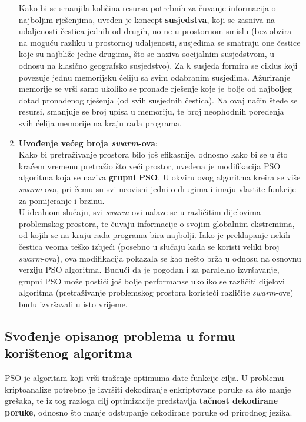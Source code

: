 \documentclass[12pt, a4paper]{article}
\begin{document}
\begin{enumerate}
Kako bi se smanjila količina resursa potrebnih za čuvanje informacija o najboljim rješenjima, uveden je koncept \textbf{susjedstva}, koji se zasniva na udaljenosti čestica jednih od drugih, no ne u prostornom smislu (bez obzira na moguću razliku u prostornoj udaljenosti, susjedima se smatraju one čestice koje su najbliže jedne drugima, što se naziva socijalnim susjedstvom, u odnosu na klasično geografsko susjedstvo). Za \texttt{k} susjeda formira se ciklus koji povezuje jednu memorijsku ćeliju sa svim odabranim susjedima. Ažuriranje memorije se vrši samo ukoliko se pronađe rješenje koje je bolje od najboljeg dotad pronađenog rješenja (od svih susjednih čestica). Na ovaj način štede se resursi, smanjuje se broj upisa u memoriju, te broj neophodnih poređenja svih ćelija memorije na kraju rada programa. \cite{pso2}

\item \textbf{Uvođenje većeg broja \textit{swarm}-ova}: \\

Kako bi pretraživanje prostora bilo još efikasnije, odnosno kako bi se u što kraćem vremenu pretražio što veći prostor, uvedena je modifikacija PSO algoritma koja se naziva \textbf{grupni PSO}. U okviru ovog algoritma kreira se više \textit{swarm}-ova, pri čemu su svi neovisni jedni o drugima i imaju vlastite funkcije za pomijeranje i brzinu. \\

U idealnom slučaju, svi \textit{swarm}-ovi nalaze se u različitim dijelovima problemskog prostora, te čuvaju informacije o svojim globalnim ekstremima, od kojih se na kraju rada programa bira najbolji. Iako je preklapanje nekih čestica veoma teško izbjeći (posebno u slučaju kada se koristi veliki broj \textit{swarm}-ova), ova modifikacija pokazala se kao nešto brža u odnosu na osnovnu verziju PSO algoritma. Budući da je pogodan i za paralelno izvršavanje, grupni PSO može postići još bolje performanse ukoliko se različiti dijelovi algoritma (pretraživanje problemskog prostora koristeći različite \textit{swarm}-ove) budu izvršavali u isto vrijeme. \cite{cryptopso}

\end{enumerate}

\subsection{Svođenje opisanog problema u formu korištenog algoritma}

PSO je algoritam koji vrši traženje optimuma date funkcije cilja. U problemu kriptoanalize potrebno je izvršiti dekodiranje enkriptovane poruke sa što manje grešaka, te iz tog razloga cilj optimizacije predstavlja \textbf{tačnost dekodirane poruke}, odnosno što manje odstupanje dekodirane poruke od prirodnog jezika. \\
\end{document}
